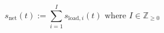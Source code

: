 \begin{equation}
	s_\text{net}(t) := \sum_{i=1}^{I} s_{\text{load},i}(t)
	\text{ where } I \in \mathbb{Z}_{\geq 0}
\end{equation}